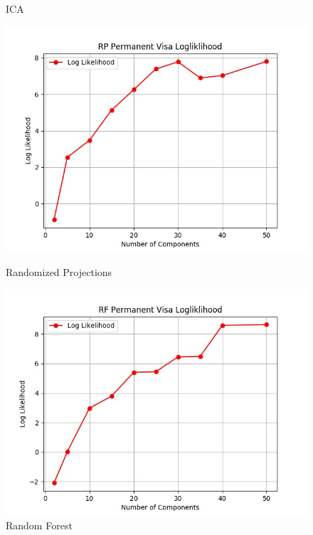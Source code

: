 \documentclass[h]{article}
\begin{document}
\begin{figure}[H]
      \caption*{ICA} 
   \endminipage\hfill
      \includegraphics[width=1\textwidth,keepaspectratio]{rp_permanent_visa_logliklihood.jpg} 
      \caption*{Randomized Projections} 
   \endminipage\hfill
      \includegraphics[width=1\textwidth,keepaspectratio]{rf_permanent_visa_logliklihood.jpg} 
      \caption*{Random Forest} 
   \endminipage\hfill
\end{figure}
\end{document}
